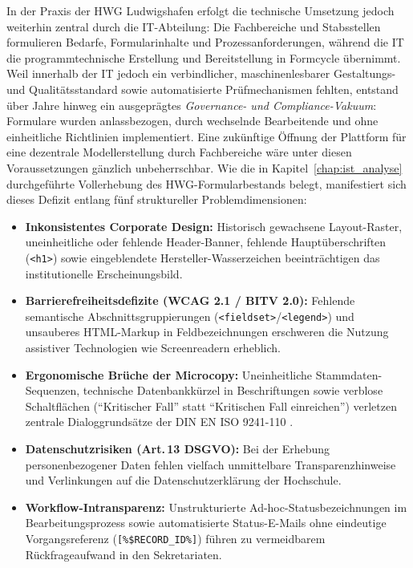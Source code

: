 In der Praxis der HWG Ludwigshafen erfolgt die technische Umsetzung jedoch weiterhin zentral durch die IT-Abteilung: Die Fachbereiche und Stabsstellen formulieren Bedarfe, Formularinhalte und Prozessanforderungen, während die IT die programmtechnische Erstellung und Bereitstellung in Formcycle übernimmt. Weil innerhalb der IT jedoch ein verbindlicher, maschinenlesbarer Gestaltungs- und Qualitätsstandard sowie automatisierte Prüfmechanismen fehlten, entstand über Jahre hinweg ein ausgeprägtes \textit{Governance- und Compliance-Vakuum}: Formulare wurden anlassbezogen, durch wechselnde Bearbeitende und ohne einheitliche Richtlinien implementiert. Eine zukünftige Öffnung der Plattform für eine dezentrale Modellerstellung durch Fachbereiche wäre unter diesen Voraussetzungen gänzlich unbeherrschbar. Wie die in Kapitel~\ref{chap:ist_analyse} durchgeführte Vollerhebung des HWG-Formularbestands belegt, manifestiert sich dieses Defizit entlang fünf struktureller Problemdimensionen:
\begin{itemize}
    \item \textbf{Inkonsistentes Corporate Design:} Historisch gewachsene Layout-Raster, uneinheitliche oder fehlende Header-Banner, fehlende Hauptüberschriften (\texttt{<h1>}) sowie eingeblendete Hersteller-Wasserzeichen beeinträchtigen das institutionelle Erscheinungsbild.
    \item \textbf{Barrierefreiheitsdefizite (WCAG 2.1 / BITV 2.0):} Fehlende semantische Abschnittsgruppierungen (\texttt{<fieldset>}/\texttt{<legend>}) und unsauberes HTML-Markup in Feldbezeichnungen erschweren die Nutzung assistiver Technologien wie Screenreadern erheblich.
    \item \textbf{Ergonomische Brüche der Microcopy:} Uneinheitliche Stamm\-daten-Sequenzen, technische Datenbankkürzel in Beschriftungen sowie verblose Schaltflächen (\enquote{Kritischer Fall} statt \enquote{Kritischen Fall einreichen}) verletzen zentrale Dialoggrundsätze der DIN EN ISO 9241-110 \parencite{iso9241110}.
    \item \textbf{Datenschutzrisiken (Art.\,13 DSGVO):} Bei der Erhebung personenbezogener Daten fehlen vielfach unmittelbare Transparenzhinweise und Verlinkungen auf die Datenschutzerklärung der Hochschule.
    \item \textbf{Workflow-Intransparenz:} Unstrukturierte Ad-hoc-Statusbezeichnungen im Bearbeitungsprozess sowie automatisierte Status-E-Mails ohne eindeutige Vorgangsreferenz (\texttt{[\%\$RECORD\_ID\%]}) führen zu vermeidbarem Rückfrageaufwand in den Sekretariaten.
\end{itemize}

